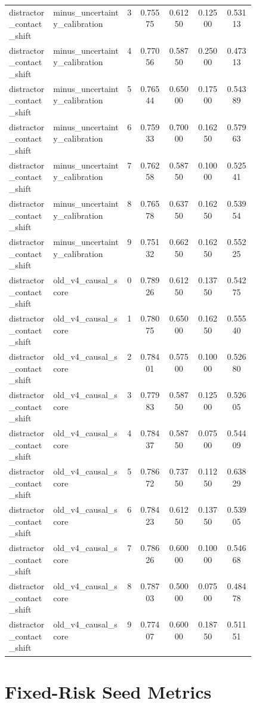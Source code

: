 \documentclass{article}
\begin{document}
\begin{center}
\begin{longtable}{p{0.18\linewidth}p{0.30\linewidth}ccccc}
distractor\_contact\_shift & minus\_uncertainty\_calibration & 3 & 0.75575 & 0.61250 & 0.12500 & 0.53113\\
distractor\_contact\_shift & minus\_uncertainty\_calibration & 4 & 0.77056 & 0.58750 & 0.25000 & 0.47313\\
distractor\_contact\_shift & minus\_uncertainty\_calibration & 5 & 0.76544 & 0.65000 & 0.17500 & 0.54389\\
distractor\_contact\_shift & minus\_uncertainty\_calibration & 6 & 0.75933 & 0.70000 & 0.16250 & 0.57963\\
distractor\_contact\_shift & minus\_uncertainty\_calibration & 7 & 0.76258 & 0.58750 & 0.10000 & 0.52541\\
distractor\_contact\_shift & minus\_uncertainty\_calibration & 8 & 0.76578 & 0.63750 & 0.16250 & 0.53954\\
distractor\_contact\_shift & minus\_uncertainty\_calibration & 9 & 0.75132 & 0.66250 & 0.16250 & 0.55225\\
distractor\_contact\_shift & old\_v4\_causal\_score & 0 & 0.78926 & 0.61250 & 0.13750 & 0.54275\\
distractor\_contact\_shift & old\_v4\_causal\_score & 1 & 0.78075 & 0.65000 & 0.16250 & 0.55540\\
distractor\_contact\_shift & old\_v4\_causal\_score & 2 & 0.78401 & 0.57500 & 0.10000 & 0.52680\\
distractor\_contact\_shift & old\_v4\_causal\_score & 3 & 0.77983 & 0.58750 & 0.12500 & 0.52605\\
distractor\_contact\_shift & old\_v4\_causal\_score & 4 & 0.78437 & 0.58750 & 0.07500 & 0.54409\\
distractor\_contact\_shift & old\_v4\_causal\_score & 5 & 0.78672 & 0.73750 & 0.11250 & 0.63829\\
distractor\_contact\_shift & old\_v4\_causal\_score & 6 & 0.78423 & 0.61250 & 0.13750 & 0.53905\\
distractor\_contact\_shift & old\_v4\_causal\_score & 7 & 0.78626 & 0.60000 & 0.10000 & 0.54668\\
distractor\_contact\_shift & old\_v4\_causal\_score & 8 & 0.78703 & 0.50000 & 0.07500 & 0.48478\\
distractor\_contact\_shift & old\_v4\_causal\_score & 9 & 0.77407 & 0.60000 & 0.18750 & 0.51151\\
\bottomrule
\end{longtable}
\normalsize
\end{center}

\section{Fixed-Risk Seed Metrics}
\end{document}
